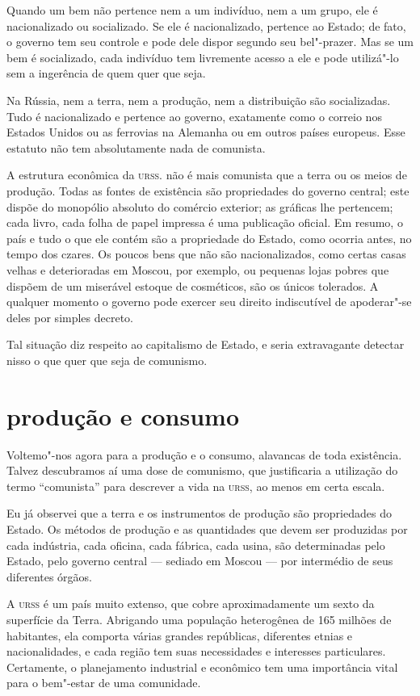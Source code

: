 Quando um bem não pertence nem a um indivíduo, nem a um grupo, ele é
nacionalizado ou socializado. Se ele é nacionalizado, pertence ao
Estado; de fato, o governo tem seu controle e pode dele dispor segundo
seu bel"-prazer. Mas se um bem é socializado, cada indivíduo tem
livremente acesso a ele e pode utilizá"-lo sem a ingerência de quem
quer que seja.

Na Rússia, nem a terra, nem a produção, nem a dis\-tribuição são
socializadas. Tudo é nacionalizado e pertence ao governo, exatamente
como o correio nos Estados Unidos ou as ferrovias na Alemanha ou em
outros países europeus. Esse estatuto não tem absolutamente nada de
comunista.

A estrutura econômica da \textsc{urss}. não é mais comunista que a terra ou os
meios de produção. Todas as fontes de existência são propriedades do
governo central; este dispõe do monopólio absoluto do comércio
exterior; as gráficas lhe pertencem; cada livro, cada folha de papel
impressa é uma publicação oficial. Em resumo, o país e tudo o que ele
contém são a propriedade do Estado, como ocorria antes, no tempo dos
czares. Os poucos bens que não são nacionalizados, como certas
casas velhas e deterioradas em Moscou, por exemplo, ou pequenas lojas pobres
que dispõem de um miserável estoque de cosméticos, são os únicos
tolerados. A qualquer momento o governo pode exercer seu direito
indiscutível de apoderar"-se deles por simples decreto.

Tal situação diz respeito ao capitalismo de Estado, e seria
extravagante detectar nisso o que quer que seja de comunismo.

\section*{produção e consumo}

Voltemo"-nos agora para a produção e o consumo, alavancas de toda
existência. Talvez descubramos aí uma dose de comunismo, que
justificaria a utilização do termo “comunista” para descrever a
vida na \textsc{urss}, ao menos em certa escala.

Eu já observei que a terra e os instrumentos de produção são propriedades
do Estado. Os métodos de produção e as quantidades que devem ser
produzidas por cada indústria, cada oficina, cada fábrica, cada
usina, são determinadas pelo Estado, pelo governo central --- sediado em
Moscou --- por intermédio de seus diferentes órgãos.

A \textsc{urss} é um país muito extenso, que cobre aproximadamente um sexto da
superfície da Terra. Abrigando uma população heterogênea de 165 milhões
de habitantes, ela comporta várias grandes repúblicas, diferentes
etnias e nacionalidades, e cada região tem suas necessidades e
interesses particulares. Certamente, o planejamento industrial e
econômico tem uma importância vital para o bem"-estar de uma
comunidade.

